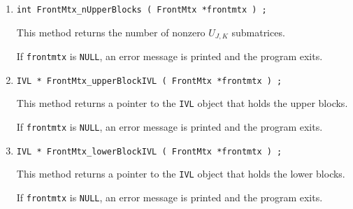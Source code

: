 \begin{enumerate}
\item
\begin{verbatim}
int FrontMtx_nUpperBlocks ( FrontMtx *frontmtx ) ;
\end{verbatim}
This method returns the number of nonzero $U_{J,K}$ submatrices.
\par {}
If {\tt frontmtx} is {\tt NULL},
an error message is printed and the program exits.
\item
\begin{verbatim}
IVL * FrontMtx_upperBlockIVL ( FrontMtx *frontmtx ) ;
\end{verbatim}
This method returns a pointer to the {\tt IVL} object that holds
the upper blocks.
\par {}
If {\tt frontmtx} is {\tt NULL},
an error message is printed and the program exits.
\item
\begin{verbatim}
IVL * FrontMtx_lowerBlockIVL ( FrontMtx *frontmtx ) ;
\end{verbatim}
This method returns a pointer to the {\tt IVL} object that holds
the lower blocks.
\par {}
If {\tt frontmtx} is {\tt NULL},
an error message is printed and the program exits.
\end{enumerate}
\par
